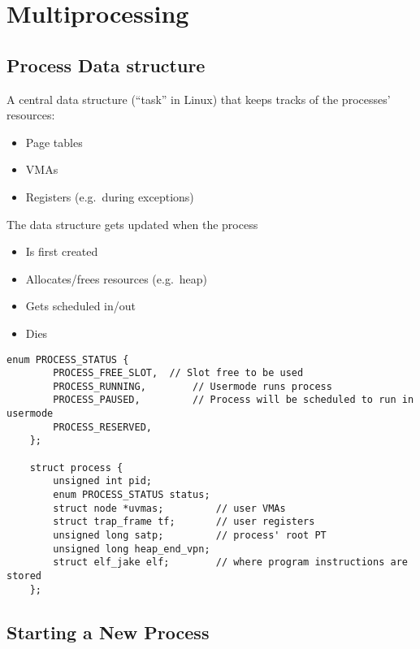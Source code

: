 \section{Multiprocessing}
\subsection{Process Data structure}
A central data structure (``task'' in Linux) that keeps tracks of the processes' resources:
\begin{itemize}
    \item Page tables
    \item VMAs
    \item Registers (e.g.\ during exceptions)
\end{itemize}
The data structure gets updated when the process
\begin{itemize}
    \item Is first created
    \item Allocates/frees resources (e.g.\ heap)
    \item Gets scheduled in/out
    \item Dies
\end{itemize}

\newpar{}
\begin{lstlisting}[style=bright_C++]
    enum PROCESS_STATUS {
        PROCESS_FREE_SLOT, 	// Slot free to be used
        PROCESS_RUNNING, 	    // Usermode runs process
        PROCESS_PAUSED, 	    // Process will be scheduled to run in usermode
        PROCESS_RESERVED,
    };

    struct process {
        unsigned int pid;
        enum PROCESS_STATUS status; 
        struct node *uvmas;         // user VMAs
        struct trap_frame tf;       // user registers
        unsigned long satp;         // process' root PT
        unsigned long heap_end_vpn;
        struct elf_jake elf;        // where program instructions are stored
    };
\end{lstlisting}

\subsection{Starting a New Process}
